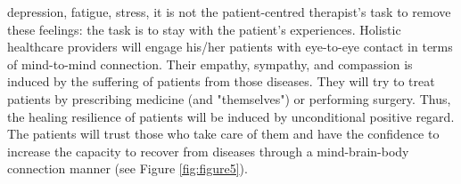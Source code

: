 \documentclass[12pt, a4paper]{article}
\begin{document}
depression, fatigue, stress, it is not the patient-centred therapist’s task to remove these feelings: the task is to stay with the patient’s experiences. 
Holistic healthcare providers will engage his/her patients with eye-to-eye contact in terms of mind-to-mind connection. Their empathy, sympathy, and compassion is induced by the suffering of patients from those diseases. They will try to treat patients by prescribing medicine (and "themselves") or performing surgery.
Thus, the healing resilience of patients will be induced by unconditional positive regard. %
The patients will trust those who take care of them and have the confidence to increase the capacity to recover from diseases through a mind-brain-body connection manner (see Figure \ref{fig:figure5}).


\end{document}

